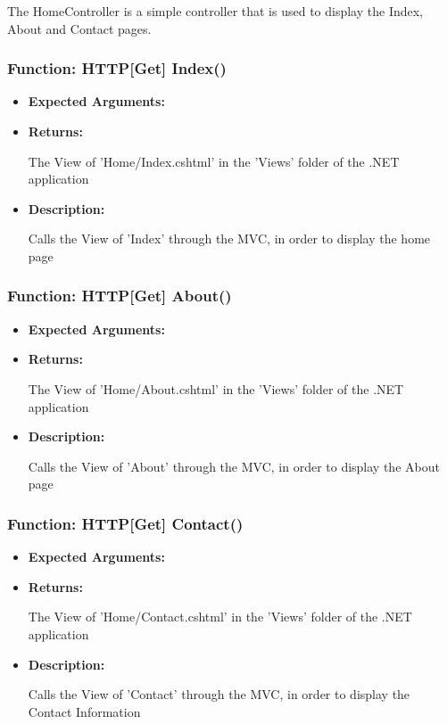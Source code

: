 \documentclass{scrreprt}
\begin{document}
The HomeController is a simple controller that is used to display the Index,
About and Contact pages.

\subsubsection{Function: HTTP[Get] Index()}

\begin{itemize}
        \item \textbf{Expected Arguments:}
        \item \textbf{Returns:}

                The View of 'Home/Index.cshtml' in the 'Views' folder of the
                .NET application

        \item \textbf{Description:}

                Calls the View of 'Index' through the MVC, in order to display
                the home page
\end{itemize}

\subsubsection{Function: HTTP[Get] About()}

\begin{itemize}
        \item \textbf{Expected Arguments:}
        \item \textbf{Returns:}

                The View of 'Home/About.cshtml' in the 'Views' folder of the .NET application

        \item \textbf{Description:}

                Calls the View of 'About' through the MVC, in order to display the About page
\end{itemize}

\subsubsection{Function: HTTP[Get] Contact()}

\begin{itemize}
        \item \textbf{Expected Arguments:}
        \item \textbf{Returns:}

                The View of 'Home/Contact.cshtml' in the 'Views' folder of the
                .NET application

        \item \textbf{Description:}

                Calls the View of 'Contact' through the MVC, in order to
                display the Contact Information
\end{itemize}
\end{document}
